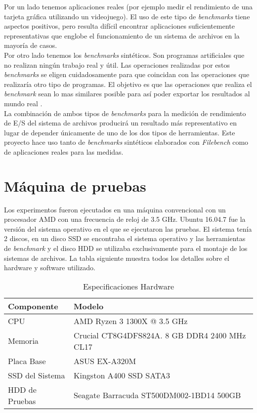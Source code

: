 Por un lado tenemos aplicaciones reales (por ejemplo medir el rendimiento de una tarjeta gráfica utilizando un videojuego). El uso de este tipo de \textit{benchmarks} tiene aspectos positivos, pero resulta difícil encontrar aplicaciones suficientemente representativas que englobe el funcionamiento de un sistema de archivos en la mayoría de casos.\\

Por otro lado tenemos los \textit{benchmarks} sintéticos. Son programas artificiales que no realizan ningún trabajo real y útil. Las operaciones realizadas por estos \textit{benchmarks} se eligen cuidadosamente para que coincidan con las operaciones que realizaría otro tipo de programas. El objetivo es que las operaciones que realiza el \textit{benchmark} sean lo mas similares posible para así poder exportar los resultados al mundo real \cite{lilja_2000}.\\

La combinación de ambos tipos de \textit{benchmarks} para la medición de rendimiento de E/S del sistema de archivos producirá un resultado más representativo en lugar de depender únicamente de uno de los dos tipos de herramientas. Este proyecto hace uso tanto de \textit{benchmarks} sintéticos elaborados con \textit{Filebench} como de aplicaciones reales para las medidas.

\section{Máquina de pruebas}
Los experimentos fueron ejecutados en una máquina convencional con un procesador AMD con una frecuencia de reloj de 3.5 GHz. Ubuntu 16.04.7 fue la versión del sistema operativo en el que se ejecutaron las pruebas. El sistema tenía 2 discos, en un disco SSD se encontraba el sistema operativo y las herramientas de \textit{benchmark} y el disco HDD se utilizaba exclusivamente para el montaje de los sistemas de archivos. La tabla siguiente muestra todos los detalles sobre el hardware y software utilizado.
\begin{table}
    \centering
    \begin{tabular}{|l|l|}
    \hline
        Componente & Modelo \\ \hline\hline
        CPU & AMD Ryzen 3 1300X @ 3.5 GHz \\ \hline
        Memoria & Crucial CT8G4DFS824A. 8 GB DDR4 2400 MHz CL17 \\ \hline
        Placa Base & ASUS EX-A320M \\ \hline
        SSD del Sistema & Kingston A400 SSD SATA3 \\ \hline
        HDD de Pruebas & Seagate Barracuda ST500DM002-1BD14 500GB \\ \hline
    \end{tabular}
    \caption{Especificaciones Hardware}
\label{table:1}
\end{table}


